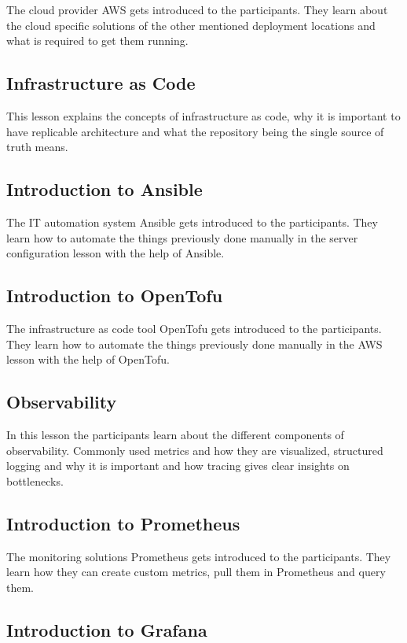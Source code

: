 \documentclass{article}
\begin{document}
The cloud provider AWS gets introduced to the participants. They learn about the
cloud specific solutions of the other mentioned deployment locations and what is
required to get them running.

\subsection{Infrastructure as Code}

This lesson explains the concepts of infrastructure as code, why it is important
to have replicable architecture and what the repository being the single source
of truth means.

\subsection{Introduction to Ansible}

The IT automation system Ansible gets introduced to the participants. They learn
how to automate the things previously done manually in the server configuration
lesson with the help of Ansible.

\subsection{Introduction to OpenTofu}

The infrastructure as code tool OpenTofu gets introduced to the participants.
They learn how to automate the things previously done manually in the AWS lesson
with the help of OpenTofu.

\subsection{Observability}

In this lesson the participants learn about the different components of
observability. Commonly used metrics and how they are visualized, structured
logging and why it is important and how tracing gives clear insights on
bottlenecks.

\subsection{Introduction to Prometheus}

The monitoring solutions Prometheus gets introduced to the participants. They
learn how they can create custom metrics, pull them in Prometheus and query
them.

\subsection{Introduction to Grafana}
\end{document}
